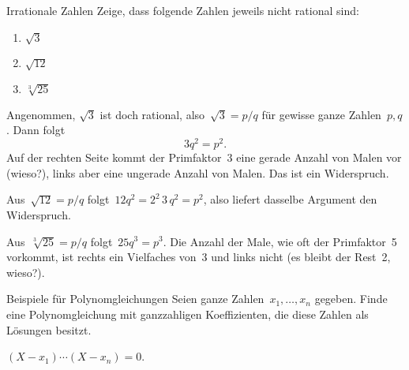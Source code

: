 \documentclass{algblatt}
\begin{document}

\begin{aufgabe}{Irrationale Zahlen}
Zeige, dass folgende Zahlen jeweils nicht rational sind:
\begin{enumerate}
\item $\sqrt{3}$
\item $\sqrt{12}$
\item $\sqrt[3]{25}$
\end{enumerate}
\begin{loesungE}
\item Angenommen, $\sqrt{3}$ ist doch rational, also~$\sqrt{3} = p/q$ für
gewisse ganze Zahlen~$p,q$. Dann folgt
\[ 3 q^2 = p^2. \]
Auf der rechten Seite kommt der Primfaktor~3 eine gerade Anzahl von Malen vor
(wieso?), links aber eine ungerade Anzahl von Malen. Das ist ein Widerspruch.
\item Aus~$\sqrt{12} = p/q$ folgt~$12 q^2 = 2^2 \, 3 \, q^2 = p^2$, also
liefert dasselbe Argument den Widerspruch.
\item Aus~$\sqrt[3]{25} = p/q$ folgt~$25 q^3 = p^3$. Die Anzahl der Male, wie
oft der Primfaktor~5 vorkommt, ist rechts ein Vielfaches von~3 und links nicht
(es bleibt der Rest~2, wieso?).
\end{loesungE}
\end{aufgabe}

\begin{aufgabe}{Beispiele für Polynomgleichungen}
Seien ganze Zahlen~$x_1, \ldots, x_n$ gegeben. Finde eine Polynomgleichung mit
ganzzahligen Koeffizienten, die diese Zahlen als Lösungen besitzt.
\begin{loesung}$(X-x_1) \cdots (X-x_n) = 0$.
\end{loesung}
\end{aufgabe}
\end{document}
